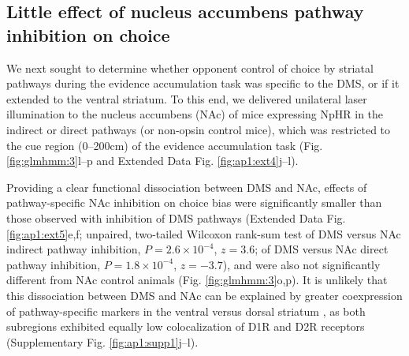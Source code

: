 \subsection{Little effect of nucleus accumbens pathway inhibition on choice}
\label{sec:glmhmm:2.2.5}

We next sought to determine whether opponent control of choice by striatal pathways during the evidence accumulation task was specific to the DMS, or if it extended to the ventral striatum. To this end, we delivered unilateral laser illumination to the nucleus accumbens (NAc) of mice expressing NpHR in the indirect or direct pathways (or non-opsin control mice), which was restricted to the cue region (0–200cm) of the evidence accumulation task (Fig. \ref{fig:glmhmm:3}l–p and Extended Data Fig. \ref{fig:ap1:ext4}j–l).

Providing a clear functional dissociation between DMS and NAc, effects of pathway-specific NAc inhibition on choice bias were significantly smaller than those observed with inhibition of DMS pathways (Extended Data Fig. \ref{fig:ap1:ext5}e,f; unpaired, two-tailed Wilcoxon rank-sum test of DMS versus NAc indirect pathway inhibition, $P=2.6 \times 10^{-4}$, $z=3.6$; of DMS versus NAc direct pathway inhibition, $P=1.8 \times 10^{-4}$, $z=-3.7$), and were also not significantly different from NAc control animals (Fig. \ref{fig:glmhmm:3}o,p). It is unlikely that this dissociation between DMS and NAc can be explained by greater coexpression of pathway-specific markers in the ventral versus dorsal striatum \cite{kupchik_coding_2015}, as both subregions exhibited equally low colocalization of D1R and D2R receptors (Supplementary Fig. \ref{fig:ap1:supp1}j–l).